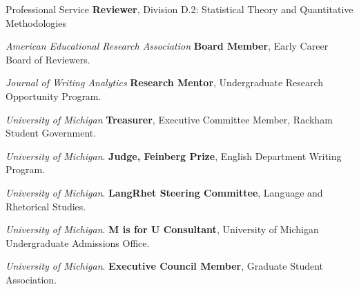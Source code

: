 \begin{rubric}{Professional Service}
    \entry*[2024 -- ]%
        \textbf{Reviewer}, Division D.2: Statistical Theory and Quantitative Methodologies
        \par\emph{American Educational Research Association}
    \entry*[2024 -- ]%
        \textbf{Board Member}, Early Career Board of Reviewers.
        \par\emph{Journal of Writing Analytics}
    \entry*[2022 -- 2023]%
        \textbf{Research Mentor}, Undergraduate Research Opportunity Program.
        \par\emph{University of Michigan}
    \entry*[2019 -- 2022]%
        \textbf{Treasurer}, Executive Committee Member, Rackham Student Government.
        \par\emph{University of Michigan}.
    \entry*[2019 -- 2022]%
        \textbf{Judge, Feinberg Prize}, English Department Writing Program.
        \par\emph{University of Michigan}.
    \entry*[2020 -- 2021]%
        \textbf{LangRhet Steering Committee}, Language and Rhetorical Studies.
        \par\emph{University of Michigan}.
    \entry*[2019]%
        \textbf{M is for U Consultant}, University of Michigan Undergraduate Admissions Office.
        \par\emph{University of Michigan}.
    \entry*[2016 -- 2018]%
        \textbf{Executive Council Member}, Graduate Student Association.

\end{rubric}
